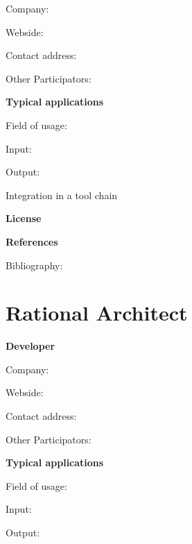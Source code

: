 \documentclass{./template/openetcs_report}
\begin{document}
	Company: 

	Webside:

	Contact address:

	Other  Participators:



	\textbf{Typical applications}

	Field of usage:


	Input:

	Output:





	Integration in a tool chain



	\textbf{License}


	\textbf{References}

	Bibliography:


\section{Rational Architect}

	\textbf{Developer}

	Company: 

	Webside:

	Contact address:

	Other  Participators:



	\textbf{Typical applications}

	Field of usage:


	Input:

	Output:


\end{document}
